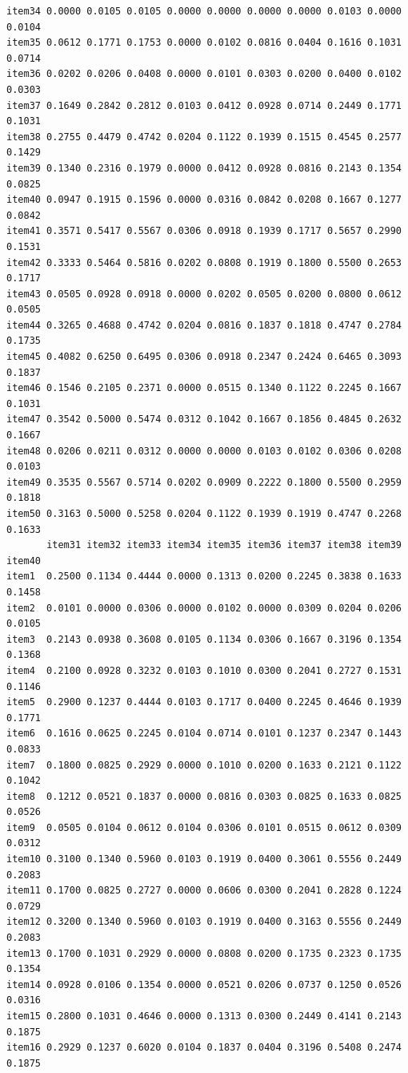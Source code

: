 \documentclass[
  a4paper,
]{ltjsbook}
\begin{document}
\begin{verbatim}
item34 0.0000 0.0105 0.0105 0.0000 0.0000 0.0000 0.0000 0.0103 0.0000 0.0104
item35 0.0612 0.1771 0.1753 0.0000 0.0102 0.0816 0.0404 0.1616 0.1031 0.0714
item36 0.0202 0.0206 0.0408 0.0000 0.0101 0.0303 0.0200 0.0400 0.0102 0.0303
item37 0.1649 0.2842 0.2812 0.0103 0.0412 0.0928 0.0714 0.2449 0.1771 0.1031
item38 0.2755 0.4479 0.4742 0.0204 0.1122 0.1939 0.1515 0.4545 0.2577 0.1429
item39 0.1340 0.2316 0.1979 0.0000 0.0412 0.0928 0.0816 0.2143 0.1354 0.0825
item40 0.0947 0.1915 0.1596 0.0000 0.0316 0.0842 0.0208 0.1667 0.1277 0.0842
item41 0.3571 0.5417 0.5567 0.0306 0.0918 0.1939 0.1717 0.5657 0.2990 0.1531
item42 0.3333 0.5464 0.5816 0.0202 0.0808 0.1919 0.1800 0.5500 0.2653 0.1717
item43 0.0505 0.0928 0.0918 0.0000 0.0202 0.0505 0.0200 0.0800 0.0612 0.0505
item44 0.3265 0.4688 0.4742 0.0204 0.0816 0.1837 0.1818 0.4747 0.2784 0.1735
item45 0.4082 0.6250 0.6495 0.0306 0.0918 0.2347 0.2424 0.6465 0.3093 0.1837
item46 0.1546 0.2105 0.2371 0.0000 0.0515 0.1340 0.1122 0.2245 0.1667 0.1031
item47 0.3542 0.5000 0.5474 0.0312 0.1042 0.1667 0.1856 0.4845 0.2632 0.1667
item48 0.0206 0.0211 0.0312 0.0000 0.0000 0.0103 0.0102 0.0306 0.0208 0.0103
item49 0.3535 0.5567 0.5714 0.0202 0.0909 0.2222 0.1800 0.5500 0.2959 0.1818
item50 0.3163 0.5000 0.5258 0.0204 0.1122 0.1939 0.1919 0.4747 0.2268 0.1633
       item31 item32 item33 item34 item35 item36 item37 item38 item39 item40
item1  0.2500 0.1134 0.4444 0.0000 0.1313 0.0200 0.2245 0.3838 0.1633 0.1458
item2  0.0101 0.0000 0.0306 0.0000 0.0102 0.0000 0.0309 0.0204 0.0206 0.0105
item3  0.2143 0.0938 0.3608 0.0105 0.1134 0.0306 0.1667 0.3196 0.1354 0.1368
item4  0.2100 0.0928 0.3232 0.0103 0.1010 0.0300 0.2041 0.2727 0.1531 0.1146
item5  0.2900 0.1237 0.4444 0.0103 0.1717 0.0400 0.2245 0.4646 0.1939 0.1771
item6  0.1616 0.0625 0.2245 0.0104 0.0714 0.0101 0.1237 0.2347 0.1443 0.0833
item7  0.1800 0.0825 0.2929 0.0000 0.1010 0.0200 0.1633 0.2121 0.1122 0.1042
item8  0.1212 0.0521 0.1837 0.0000 0.0816 0.0303 0.0825 0.1633 0.0825 0.0526
item9  0.0505 0.0104 0.0612 0.0104 0.0306 0.0101 0.0515 0.0612 0.0309 0.0312
item10 0.3100 0.1340 0.5960 0.0103 0.1919 0.0400 0.3061 0.5556 0.2449 0.2083
item11 0.1700 0.0825 0.2727 0.0000 0.0606 0.0300 0.2041 0.2828 0.1224 0.0729
item12 0.3200 0.1340 0.5960 0.0103 0.1919 0.0400 0.3163 0.5556 0.2449 0.2083
item13 0.1700 0.1031 0.2929 0.0000 0.0808 0.0200 0.1735 0.2323 0.1735 0.1354
item14 0.0928 0.0106 0.1354 0.0000 0.0521 0.0206 0.0737 0.1250 0.0526 0.0316
item15 0.2800 0.1031 0.4646 0.0000 0.1313 0.0300 0.2449 0.4141 0.2143 0.1875
item16 0.2929 0.1237 0.6020 0.0104 0.1837 0.0404 0.3196 0.5408 0.2474 0.1875

\end{verbatim}
\end{document}
